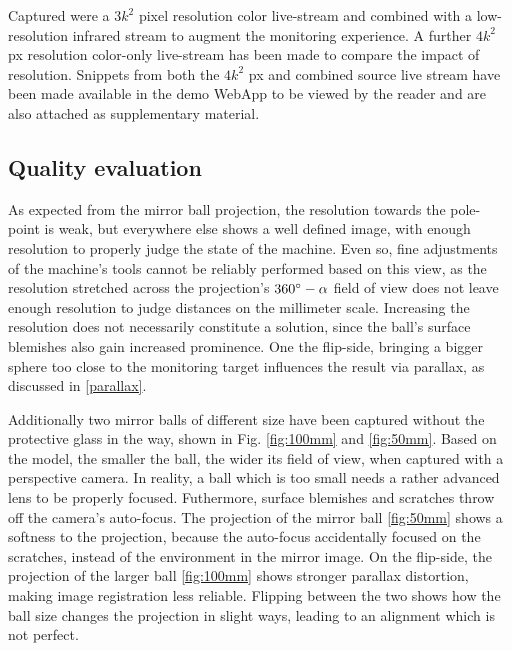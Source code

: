 \documentclass[10pt]{article}
\begin{document}
\begin{multicols}{2}
	Captured were a $3k^2$ pixel resolution color live-stream and combined with a low-resolution infrared stream to augment the monitoring experience. A further $4k^2$ px resolution color-only live-stream has been made to compare the impact of resolution. Snippets from both the $4k^2$ px and combined source live stream have been made available in the demo WebApp to be viewed by the reader and are also attached as supplementary material.

	\subsection{Quality evaluation}
	As expected from the mirror ball projection, the resolution towards the pole-point is weak, but everywhere else shows a well defined image, with enough resolution to properly judge the state of the machine. Even so, fine adjustments of the machine's tools cannot be reliably performed based on this view, as the resolution stretched across the projection's $360\degree-\alpha$ field of view does not leave enough resolution to judge distances on the millimeter scale. Increasing the resolution does not necessarily constitute a solution, since the ball's surface blemishes also gain increased prominence. One the flip-side, bringing a bigger sphere too close to the monitoring target influences the result via parallax, as discussed in \ref{parallax}.
	
	Additionally two mirror balls of different size have been captured without the protective glass in the way, shown in Fig. \ref{fig:100mm} and \ref{fig:50mm}. Based on the model, the smaller the ball, the wider its field of view, when captured with a perspective camera. In reality, a ball which is too small needs a rather advanced lens to be properly focused. Futhermore, surface blemishes and scratches throw off the camera's auto-focus. The projection of the mirror ball \ref{fig:50mm} shows a softness to the projection, because the auto-focus accidentally focused on the scratches, instead of the environment in the  mirror image. On the flip-side, the projection of the larger ball \ref{fig:100mm} shows stronger parallax distortion, making image registration less reliable. Flipping between the two shows how the ball size changes the projection in slight ways, leading to an alignment which is not perfect.


\end{multicols}
\end{document}
